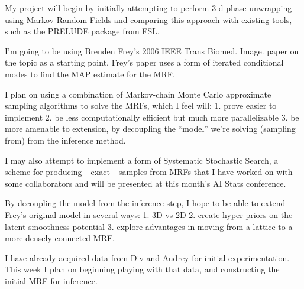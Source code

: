 

My project will begin by initially attempting to perform 3-d phase
unwrapping using Markov Random Fields and comparing this approach with
existing tools, such as the PRELUDE package from FSL.

I'm going to be using Brenden Frey's 2006 IEEE Trans Biomed. Image. paper
on the topic as a starting point. Frey's paper uses a form of iterated
conditional modes to find the MAP estimate for the MRF. 

I plan on using a combination of Markov-chain Monte Carlo approximate
sampling algorithms to solve the MRFs, which I feel will: 
  1. prove easier to implement
  2. be less computationally efficient but much more parallelizable
  3. be more amenable to extension, by decoupling the ``model'' we're 
solving (sampling from) from the inference method. 

I may also attempt to implement a form of Systematic Stochastic
Search, a scheme for producing _exact_ samples from MRFs that I have
worked on with some collaborators and will be presented at this
month's AI Stats conference.

By decoupling the model from the inference step, I hope to be able to
extend Frey's original model in several ways: 
   1. 3D vs 2D
   2. create hyper-priors on the latent smoothness potential 
   3. explore advantages in moving from a lattice to a more  densely-connected
MRF. 

I have already acquired data from Div and Audrey for initial experimentation. 
This week I plan on beginning playing with that data, and constructing the
initial MRF for inference. 
